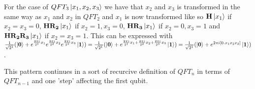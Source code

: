 For the case of $QFT_3\ket{x_1,x_2,x_3}$ we have that $x_2$ and $x_3$ is transformed in the same way as $x_1$ and $x_2$ in $QFT_2$ and $x_1$ is now transformed like so $\mathbf{H}\ket{x_1}$ if $x_2=x_3=0$, $\mathbf{H}\mathbf{R_{2}}\ket{x_1}$ if $x_2=1,x_3=0$, $\mathbf{H}\mathbf{R_{3}}\ket{x_1}$ if $x_2=0,x_3=1$ and $\mathbf{H}\mathbf{R_{2}}\mathbf{R_{3}}\ket{x_1}$ if $x_2=x_3=1$. 
This can be expressed with 
$\frac{1}{\sqrt{2^1}}(\ket{\mathbf{0}}+e^{\frac{2\pi i}{2^1}x_1}e^{\frac{2\pi i}{2^2}x_2}e^{\frac{2\pi i}{2^3}x_3}\ket{\mathbf{1}})= \frac{1}{\sqrt{2^1}}(\ket{\mathbf{0}}+e^{\frac{2\pi i}{2^1}x_1+\frac{2\pi i}{2^2}x_2+\frac{2\pi i}{2^3}x_3}\ket{\mathbf{1}})=\frac{1}{\sqrt{2^1}}(\ket{\mathbf{0}}+e^{2\pi i[0.x_1x_2x_3]}\ket{\mathbf{1}})$.

This pattern continues in a sort of recurcive definition of $QFT_n$ in terms of $QFT_{n-1}$ and one 'step' affecting the first qubit. 


